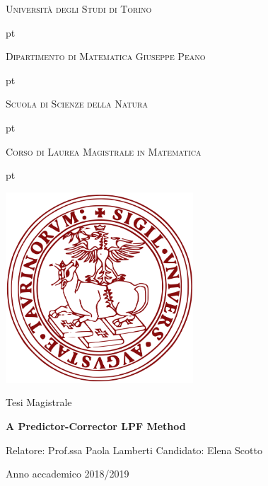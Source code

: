 \documentclass[a4paper,10 pt,titlepage,twoside]{book}
\theoremstyle{plain}
\theoremstyle{definition}
\theoremstyle{remark}
\begin{document}
\thispagestyle{empty}

\centerline {\huge{\textsc{Università degli Studi di Torino}}}
 pt

\centerline {\Large{\textsc{Dipartimento di Matematica Giuseppe Peano}}}

 pt

\centerline {\Large{\textsc{Scuola di Scienze della Natura}}}

 pt

\centerline {\Large{\textsc{Corso di Laurea Magistrale in Matematica}}}


 pt





\centerline {\includegraphics[width=7cm]{logo.jpg}}
\vskip 1.2cm
\centerline {\normalsize {Tesi Magistrale}} 

\vskip 0.7cm

\centerline {\Large {\bf A Predictor-Corrector LPF Method}}

\vskip 1.7cm

\noindent Relatore: Prof.ssa Paola Lamberti
\hfill  {Candidato: Elena Scotto }\\





\vskip 2.7cm


\centerline{Anno accademico 2018/2019}

\tableofcontents

% 
%
\end{document}
